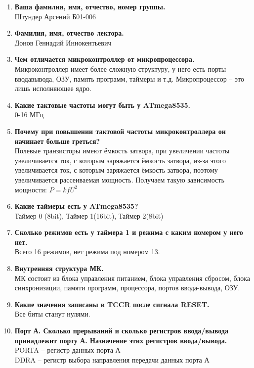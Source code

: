 \documentclass[a4paper, 12pt, twoside]{article}
\begin{document}
\begin{enumerate}
	\item \textbf{Ваша фамилия, имя, отчество, номер группы.}\\
		Штундер Арсений Б01-006

	\item \textbf{Фамилия, имя, отчество лектора.}\\
		Донов Геннадий Иннокентьевич
	\item \textbf{Чем отличается микроконтроллер от микропроцессора.}\\
		Микроконтроллер имеет более сложную структуру, у него есть порты вводавывода, ОЗУ, память программ, таймеры и т.д. Микропроцессор – это лишь исполняющее
ядро.
	\item \textbf{Какие тактовые частоты могут быть у ATmega8535.}\\
		0-16 МГц
	\item \textbf{Почему при повышении тактовой частоты микроконтроллера он начинает
больше греться?}\\
		Полевые транзисторы имеют ёмкость затвора, при увеличении частоты увеличивается ток, с которым заряжается ёмкость затвора, из-за этого увеличивается ток, с которым заряжается ёмкость затвора, поэтому увеличивается рассеиваемая мощность. Получаем такую зависимость мощности: $P = kfU^2$
	\item \textbf{Какие таймеры есть у ATmega8535?}\\
		Таймер 0 (8bit), Таймер 1(16bit), Таймер 2(8bit)
	\item \textbf{Сколько режимов есть у таймера 1 и режима с каким номером у него нет.}\\
		Всего 16 режимов, нет режима под номером 13. 
	\item \textbf{Внутренняя структура МК.}\\
		МК состоит из блока управления питанием, блока управления сбросом, блока синхронизации, памяти программ, процессора, портов ввода-вывода, ОЗУ.
	\item \textbf{Какие значения записаны в TCCR после сигнала RESET.}\\
		Все биты станут нулями.
	\item \textbf{Порт А. Сколько прерываний и сколько регистров ввода/вывода принадлежит порту А. Назначение этих регистров ввода/вывода.}\\
		PORTA – регистр данных порта А\\
		DDRA – регистр выбора направления передачи данных порта А\\

\end{enumerate}
\end{document}

